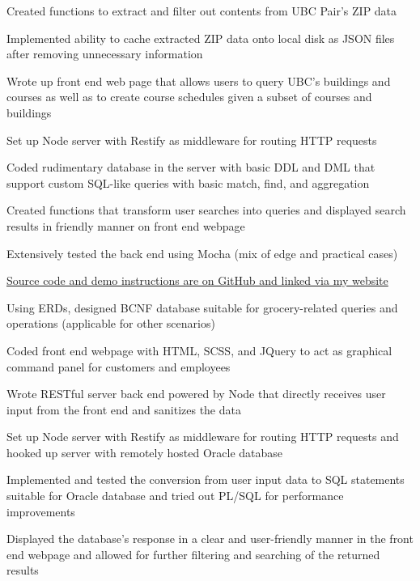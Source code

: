 \documentclass[]{deedy-resume-openfont}
\begin{document}
\begin{tightemize}
\item Created functions to extract and filter out contents from UBC Pair's ZIP data
\item Implemented ability to cache extracted ZIP data onto local disk as JSON files after removing unnecessary information
\item Wrote up front end web page that allows users to query UBC's buildings and courses as well as to create course schedules given a subset of courses and buildings
\item Set up Node server with Restify as middleware for routing HTTP requests
\item Coded rudimentary database in the server with basic DDL and DML that support custom SQL-like queries with basic match, find, and aggregation
\item Created functions that transform user searches into queries and displayed search results in friendly manner on front end webpage
\item Extensively tested the back end using Mocha (mix of edge and practical cases)
\end{tightemize}
\sectionsep

\begin{tightemize}
\item {\href{https://github.com/jonathanwangg/GroceryStoreManagementSystem}{Source code and demo instructions are on GitHub and linked via my website}}
\item Using ERDs, designed BCNF database suitable for grocery-related queries and operations (applicable for other scenarios)
\item Coded front end webpage with HTML, SCSS, and JQuery to act as graphical command panel for customers and employees
\item Wrote RESTful server back end powered by Node that directly receives user input from the front end and sanitizes the data
\item Set up Node server with Restify as middleware for routing HTTP requests and hooked up server with remotely hosted Oracle database
\item Implemented and tested the conversion from user input data to SQL statements suitable for Oracle database and tried out PL/SQL for performance improvements
\item Displayed the database's response in a clear and user-friendly manner in the front end webpage and allowed for further filtering and searching of the returned results
\end{tightemize}
\sectionsep
\end{document}
